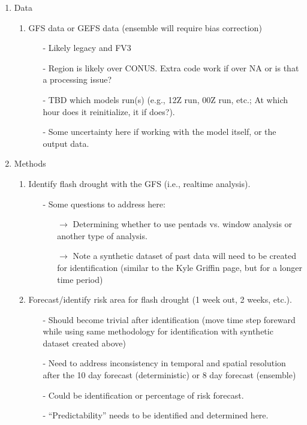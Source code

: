 \documentclass[12pt, letterpaper]{article}
\begin{document}
\begin{enumerate}
    \item Data
    \begin{enumerate}
      \item GFS data or GEFS data (ensemble will require bias correction)
      \begin{itemize}
        \item[-] Likely legacy and FV3
        \item[-] Region is likely over CONUS. Extra code work if over NA or is that a
                 processing issue?
        \item[-] TBD which models run(s) (e.g., 12Z run, 00Z run, etc.; At which hour does it
                 reinitialize, it if does?).
        \item[-] Some uncertainty here if working with the model itself, or the output data.
      \end{itemize}
    \end{enumerate}

    \item Methods
      \begin{enumerate}
        \item Identify flash drought with the GFS (i.e., realtime analysis).
        \begin{itemize}
          \item[-] Some questions to address here:
          \begin{itemize}
            \item[$\rightarrow$] Determining whether to use pentads vs. window analysis or
                                 another type of analysis.
            \item[$\rightarrow$] Note a synthetic dataset of past data will need to be
                                 created for identification (similar to the Kyle Griffin
                                 page, but for a longer time period)
          \end{itemize}
        \end{itemize}
        \item Forecast/identify risk area for flash drought (1 week out, 2 weeks, etc.).
        \begin{itemize}
          \item[-] Should become trivial after identification (move time step foreward 
                   while using same methodology for identification with synthetic dataset
                   created above)
          \item[-] Need to address inconsistency in temporal and spatial resolution after
                   the 10 day forecast (deterministic) or 8 day forecast (ensemble)
          \item[-] Could be identification or percentage of risk forecast.
          \item[-] ``Predictability'' needs to be identified and determined here.
        \end{itemize}
      \end{enumerate}
    

\end{enumerate}
\end{document}
